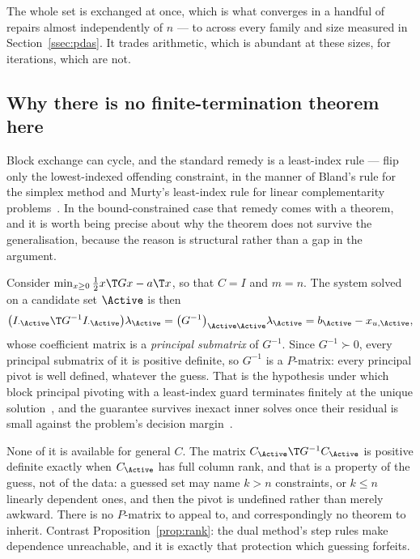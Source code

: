 The whole set is exchanged at once, which is what converges in a handful of
repairs almost independently of $n$ --- \qpPdasRepairsLo{} to
\qpPdasRepairsHi{} across every family and size measured in
Section~\ref{ssec:pdas}. It trades arithmetic, which is abundant at these sizes,
for iterations, which are not.

\subsection{Why there is no finite-termination theorem here}

Block exchange can cycle, and the standard remedy is a least-index rule --- flip
only the lowest-indexed offending constraint, in the manner of Bland's rule for
the simplex method and Murty's least-index rule for linear complementarity
problems~\cite{murty1988}. In the bound-constrained case that remedy comes with a
theorem, and it is worth being precise about why the theorem does not survive the
generalisation, because the reason is structural rather than a gap in the
argument.

Consider $\min_{x \ge 0} \tfrac12 x\T G x - a\T x$, so that $C = I$ and $m = n$.
The system solved on a candidate set $\Active$ is then
\begin{equation}
  \bigl(I_{\cdot\Active}\T G^{-1} I_{\cdot\Active}\bigr)\lambda_\Active
  = \bigl(G^{-1}\bigr)_{\Active\Active}\lambda_\Active
  = b_\Active - x_{u,\Active},
  \label{eq:principal}
\end{equation}
whose coefficient matrix is a \emph{principal submatrix} of $G^{-1}$. Since
$G^{-1} \succ 0$, every principal submatrix of it is positive definite, so
$G^{-1}$ is a $P$-matrix: every principal pivot is well defined, whatever the
guess. That is the hypothesis under which block principal pivoting with a
least-index guard terminates finitely at the unique
solution~\cite{judice1994,murty1988}, and the guarantee survives inexact inner
solves once their residual is small against the problem's decision
margin~\cite{schmelzer2026nncg}.

None of it is available for general $C$. The matrix
$C_\Active\T G^{-1} C_\Active$ is positive definite exactly when $C_\Active$ has
full column rank, and that is a property of the guess, not of the data: a guessed
set may name $k > n$ constraints, or $k \le n$ linearly dependent ones, and then
the pivot is undefined rather than merely awkward. There is no $P$-matrix to
appeal to, and correspondingly no theorem to inherit. Contrast
Proposition~\ref{prop:rank}: the dual method's step rules make dependence
unreachable, and it is exactly that protection which guessing forfeits.

